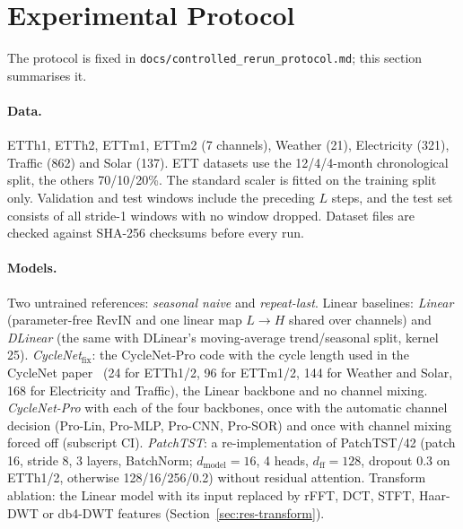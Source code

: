 \documentclass[11pt,a4paper]{article}
\begin{document}
\section{Experimental Protocol}
\label{sec:protocol}
The protocol is fixed in \nolinkurl{docs/controlled_rerun_protocol.md}; this section summarises it.

\paragraph{Data.}
ETTh1, ETTh2, ETTm1, ETTm2 (7 channels), Weather (21), Electricity (321), Traffic (862) and Solar (137). ETT datasets use the 12/4/4-month chronological split, the others 70/10/20\%. The standard scaler is fitted on the training split only. Validation and test windows include the preceding $L$ steps, and the test set consists of all stride-1 windows with no window dropped. Dataset files are checked against SHA-256 checksums before every run.

\paragraph{Models.}
Two untrained references: \emph{seasonal naive} and \emph{repeat-last}. Linear baselines: \emph{Linear} (parameter-free RevIN and one linear map $L\to H$ shared over channels) and \emph{DLinear} (the same with DLinear's moving-average trend/seasonal split, kernel 25). \emph{CycleNet$_{\text{fix}}$}: the CycleNet-Pro code with the cycle length used in the CycleNet paper~\cite{liu2024cyclenet} (24 for ETTh1/2, 96 for ETTm1/2, 144 for Weather and Solar, 168 for Electricity and Traffic), the Linear backbone and no channel mixing. \emph{CycleNet-Pro} with each of the four backbones, once with the automatic channel decision (Pro-Lin, Pro-MLP, Pro-CNN, Pro-SOR) and once with channel mixing forced off (subscript CI). \emph{PatchTST}: a re-implementation of PatchTST/42 (patch 16, stride 8, 3 layers, BatchNorm; $d_{\text{model}}=16$, 4 heads, $d_{\text{ff}}=128$, dropout 0.3 on ETTh1/2, otherwise 128/16/256/0.2) without residual attention. Transform ablation: the Linear model with its input replaced by rFFT, DCT, STFT, Haar-DWT or db4-DWT features (Section~\ref{sec:res-transform}).
\end{document}
